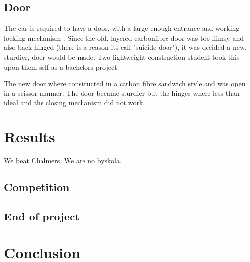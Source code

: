 \subsection{Door}
The car is required to have a door, with a large enough entrance and working locking mechanism \cite{semrules16c1}. Since the old, layered carbonfibre door was too flimsy and also back hinged (there is a reason its call "suicide door"), it was decided a new, sturdier, door would be made. Two lightweight-construction student took this upon them self as a bachelors project. 

The new door where constructed in a carbon fibre sandwich style and was open in a scissor manner. The door became sturdier but the hinges where less than ideal and the closing mechanism did not work.

\section{Results}
We beat Chalmers. We are no byskola.
\subsection{Competition}

\subsection{End of project}

\section{Conclusion}
